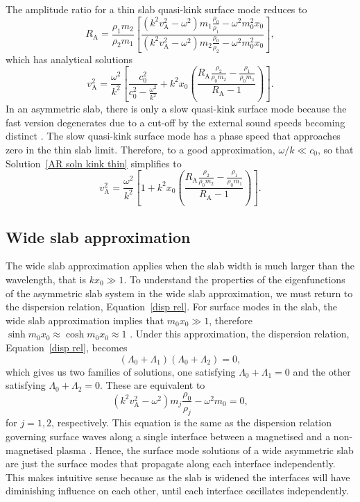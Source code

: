 \documentclass[namedreferences]{solarphysics}
\numberwithin{equation}{section}
\begin{document}
\begin{article}
The amplitude ratio for a thin slab quasi-kink surface mode reduces to
\begin{equation}
R_\textrm{A} = \frac{\rho_1m_2}{\rho_2m_1}\left[\frac{(k^2v_\textrm{A}^2-\omega^2)m_1\frac{\rho_0}{\rho_1}-\omega^2m_0^2x_0}{(k^2v_\textrm{A}^2-\omega^2)m_2\frac{\rho_0}{\rho_2}-\omega^2m_0^2x_0}\right], 
\end{equation}
which has analytical solutions
\begin{equation}
v_\textrm{A}^2 = \frac{\omega^2}{k^2} \left[\frac{c_0^2}{c_0^2 - \frac{\omega^2}{k^2}} + k^2x_0\left(\frac{R_\textrm{A}\frac{\rho_2}{\rho_0m_2} - \frac{\rho_1}{\rho_0m_1}}{R_\textrm{A} - 1}\right)\right]. \label{AR soln kink thin}
\end{equation}
In an asymmetric slab, there is only a slow quasi-kink surface mode because the fast version degenerates due to a cut-off by the external sound speeds becoming distinct \citep{all_etal17}. The slow quasi-kink surface mode has a phase speed that approaches zero in the thin slab limit. Therefore, to a good approximation, $\omega/k \ll c_0$, so that Solution~\eqref{AR soln kink thin} simplifies to
\begin{equation}
v_\textrm{A}^2 = \frac{\omega^2}{k^2} \left[1 + k^2x_0\left(\frac{R_\textrm{A}\frac{\rho_2}{\rho_0m_2} - \frac{\rho_1}{\rho_0m_1}}{R_\textrm{A} - 1}\right)\right]. \label{AR soln kink thin simplified}
\end{equation}

\subsection{Wide slab approximation} \label{sec: AR wide slab}
The wide slab approximation applies when the slab width is much larger than the wavelength, that is $kx_0 \gg 1$. To understand the properties of the eigenfunctions of the asymmetric slab system in the wide slab approximation, we must return to the dispersion relation, Equation~\eqref{disp rel}. For surface modes in the slab, the wide slab approximation implies that $m_0x_0 \gg 1$, therefore ${\sinh{m_0x_0} \approx \cosh{m_0x_0} \approx 1}$ \citep{rob81b}. Under this approximation, the dispersion relation, Equation~\eqref{disp rel}, becomes
\begin{equation}
(\Lambda_0 + \Lambda_1)(\Lambda_0 + \Lambda_2) = 0,
\end{equation}
which gives us two families of solutions, one satisfying $\Lambda_0 + \Lambda_1 = 0$ and the other satisfying $\Lambda_0 + \Lambda_2 = 0$. These are equivalent to
\begin{equation}
(k^2v_\textrm{A}^2 - \omega^2)m_j\frac{\rho_0}{\rho_j} - \omega^2m_0 = 0,
\end{equation}
for $j = 1, 2$, respectively. This equation is the same as the dispersion relation governing surface waves along a single interface between a magnetised and a non-magnetised plasma \citep{rob81a}. Hence, the surface mode solutions of a wide asymmetric slab are just the surface modes that propagate along each interface independently. This makes intuitive sense because as the slab is widened the interfaces will have diminishing influence on each other, until each interface oscillates independently.


\end{article}
\end{document}
